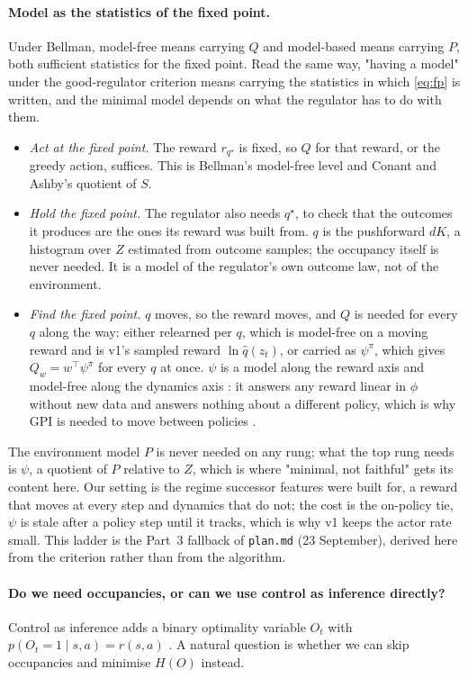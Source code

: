 \documentclass[10pt]{article}
\theoremstyle{plain}
\begin{document}
\paragraph{Model as the statistics of the fixed point.}
Under Bellman, model-free means carrying $Q$ and model-based means carrying $P$, both sufficient statistics for the fixed point.
Read the same way, "having a model" under the good-regulator criterion means carrying the statistics in which \eqref{eq:fp} is written, and the minimal model depends on what the regulator has to do with them.
\begin{itemize}
\item \emph{Act at the fixed point.} The reward $r_{q^\star}$ is fixed, so $Q$ for that reward, or the greedy action, suffices. This is Bellman's model-free level and Conant and Ashby's quotient of $S$.
\item \emph{Hold the fixed point.} The regulator also needs $q^\star$, to check that the outcomes it produces are the ones its reward was built from. $q$ is the pushforward $dK$, a histogram over $Z$ estimated from outcome samples; the occupancy itself is never needed. It is a model of the regulator's own outcome law, not of the environment.
\item \emph{Find the fixed point.} $q$ moves, so the reward moves, and $Q$ is needed for every $q$ along the way: either relearned per $q$, which is model-free on a moving reward and is v1's sampled reward $\ln \hat q(z_t)$, or carried as $\psi^\pi$, which gives $Q_w = w^\top \psi^\pi$ for every $q$ at once. $\psi$ is a model along the reward axis and model-free along the dynamics axis \citep{Lehnert-successor19}: it answers any reward linear in $\phi$ without new data and answers nothing about a different policy, which is why GPI is needed to move between policies \citep{Barreto-successor17}.
\end{itemize}
The environment model $P$ is never needed on any rung; what the top rung needs is $\psi$, a quotient of $P$ relative to $Z$, which is where "minimal, not faithful" gets its content here.
Our setting is the regime successor features were built for, a reward that moves at every step and dynamics that do not; the cost is the on-policy tie, $\psi$ is stale after a policy step until it tracks, which is why v1 keeps the actor rate small.
This ladder is the Part~3 fallback of \texttt{plan.md} (23 September), derived here from the criterion rather than from the algorithm.

\paragraph{Do we need occupancies, or can we use control as inference directly?}
Control as inference adds a binary optimality variable $O_t$ with $p(O_t = 1 \mid s,a) = r(s,a)$ \citep{Toussaint-probabilistic06,Levine-reinforcement18}.
A natural question is whether we can skip occupancies and minimise $H(O)$ instead.
\end{document}
